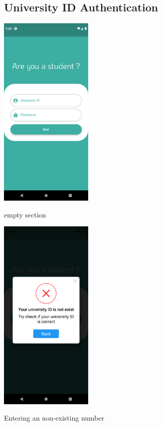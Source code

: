 \documentclass[12pt]{article}
\begin{document}
\begin{figure}[h!]
\subsection*{University ID Authentication}
{\includegraphics[width=0.4\textwidth]{./Screenshots/2.PNG}}
  \caption{empty section}
\end{figure}


\begin{figure}[h!]
{\includegraphics[width=0.4\textwidth]{./Screenshots/4.PNG}}
  \caption{Entering an non-existing number}
\end{figure}
\end{document}
